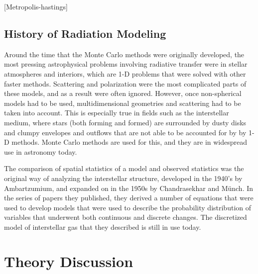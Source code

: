 \documentclass[a4paper]{article}
\begin{document}
[Metropolis-hastings]

\subsection{History of Radiation Modeling}
Around the time that the Monte Carlo methods were originally developed, the most pressing astrophysical problems involving radiative transfer were in stellar atmospheres and interiors, which are 1-D problems that were solved with other faster methods. Scattering and polarization were the most complicated parts of these models, and as a result were often ignored. However, once non-spherical models had to be used, multidimensional geometries and scattering had to be taken into account. This is especially true in fields such as the interstellar medium, where stars (both forming and formed) are surrounded by dusty disks and clumpy envelopes and outflows that are not able to be accounted for by by 1-D methods. Monte Carlo methods are used for this, and they are in widespread use in astronomy today.

The comparison of spatial statistics of a model and observed statistics was the original way of analyzing the interstellar structure, developed in the 1940's by Ambartzumium, and expanded on in the 1950s by Chandrasekhar and M\"unch. In the series of papers they published, they derived a number of equations that were used to develop models that were used to describe the probability distribution of variables that underwent both continuous and discrete changes. The discretized model of interstellar gas that they described is still in use today.

\section{Theory Discussion}
\end{document}
